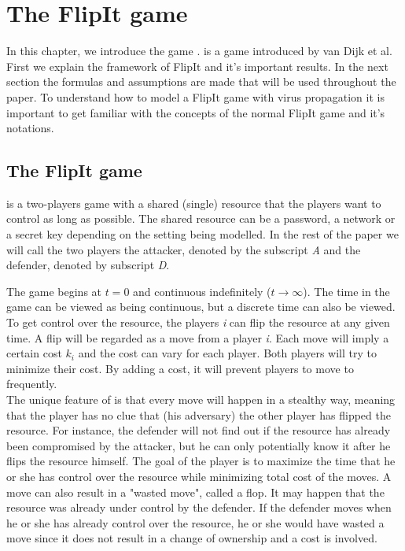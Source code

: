 \chapter{The FlipIt game}
\label{cha:2}


In this chapter, we introduce the game  \cite{FlipIt}.  is a game introduced by van Dijk et al. First we explain the framework of FlipIt and it's important results. In the next section the formulas and assumptions are made that will be used throughout the paper. To understand how to model a FlipIt game with virus propagation it is important to get familiar with the concepts of the normal FlipIt game and it's notations.   

\section{The FlipIt game}
 is a two-players game with a shared (single) resource that the players want to control as long as possible. The shared resource can be a password, a network or a secret key depending on the setting being modelled. In the rest of the paper we will call the two players the attacker, denoted by the subscript \textit{A} and the defender, denoted by subscript \textit{D}. 

The game begins at $t=0$ and continuous indefinitely ($t \rightarrow \infty $). The time in the game can be viewed as being continuous, but a discrete time can also be viewed. To get control over the resource, the players \textit{i} can flip the resource at any given time. A flip will be regarded as a move from a player \textit{i}. Each move will imply a certain cost $k_{i}$ and the cost can vary for each player. Both players will try to minimize their cost. By adding a cost, it will prevent players to move to frequently. \\

The unique feature of  is that every move will happen in a stealthy way, meaning that the player has no clue that (his adversary) the other player has flipped the resource. For instance, the defender will not find out if the resource has already been compromised by the attacker, but he can only potentially know it after he flips the resource himself. The goal of the player is to maximize the time that he or she has control over the resource while minimizing total cost of the moves. A move can also result in a "wasted move", called a flop. It may happen that the resource was already under control by the defender. If the defender moves when he or she has already control over the resource, he or she would have wasted a move since it does not result in a change of ownership and a cost is involved. \\


